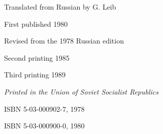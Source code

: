 \clearpage

\noindent
Translated from Russian by G. Leib

\vspace{40pt}

\noindent
First published 1980

\noindent
Revised from the 1978 Russian edition

\noindent
Second printing 1985

\noindent
Third printing 1989




\vfill
\noindent
\textit{Printed in the Union of Soviet Socialist Republics}

\vspace{30pt}

\noindent
ISBN 5-03-000902-7, 1978

\noindent
ISBN 5-03-000900-0, 1980

\thispagestyle{empty}
